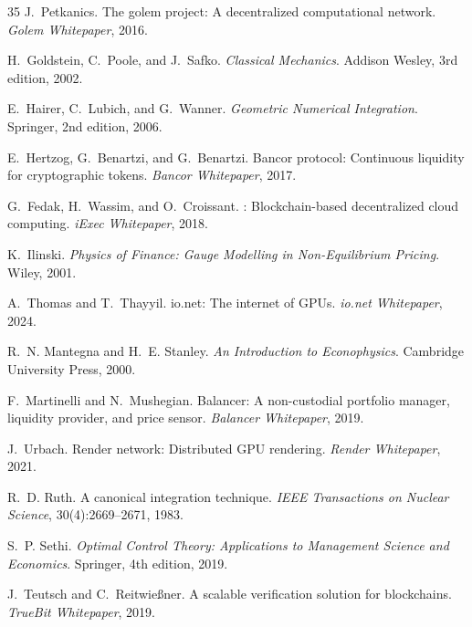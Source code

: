 \begin{thebibliography}{35}
J.~Petkanics.
\newblock The golem project: A decentralized computational network.
\newblock \emph{Golem Whitepaper}, 2016.

H.~Goldstein, C.~Poole, and J.~Safko.
\newblock \emph{Classical Mechanics}.
\newblock Addison Wesley, 3rd edition, 2002.

E.~Hairer, C.~Lubich, and G.~Wanner.
\newblock \emph{Geometric Numerical Integration}.
\newblock Springer, 2nd edition, 2006.

E.~Hertzog, G.~Benartzi, and G.~Benartzi.
\newblock Bancor protocol: Continuous liquidity for cryptographic tokens.
\newblock \emph{Bancor Whitepaper}, 2017.

G.~Fedak, H.~Wassim, and O.~Croissant.
: Blockchain-based decentralized cloud computing.
\newblock \emph{iExec Whitepaper}, 2018.

K.~Ilinski.
\newblock \emph{Physics of Finance: Gauge Modelling in Non-Equilibrium Pricing}.
\newblock Wiley, 2001.

A.~Thomas and T.~Thayyil.
\newblock io.net: The internet of {GPU}s.
\newblock \emph{io.net Whitepaper}, 2024.

R.~N. Mantegna and H.~E. Stanley.
\newblock \emph{An Introduction to Econophysics}.
\newblock Cambridge University Press, 2000.

F.~Martinelli and N.~Mushegian.
\newblock Balancer: A non-custodial portfolio manager, liquidity provider, and price sensor.
\newblock \emph{Balancer Whitepaper}, 2019.

J.~Urbach.
\newblock Render network: Distributed {GPU} rendering.
\newblock \emph{Render Whitepaper}, 2021.

R.~D. Ruth.
\newblock A canonical integration technique.
\newblock \emph{IEEE Transactions on Nuclear Science}, 30(4):2669--2671, 1983.

S.~P. Sethi.
\newblock \emph{Optimal Control Theory: Applications to Management Science and Economics}.
\newblock Springer, 4th edition, 2019.

J.~Teutsch and C.~Reitwie{\ss}ner.
\newblock A scalable verification solution for blockchains.
\newblock \emph{TrueBit Whitepaper}, 2019.


\end{thebibliography}
